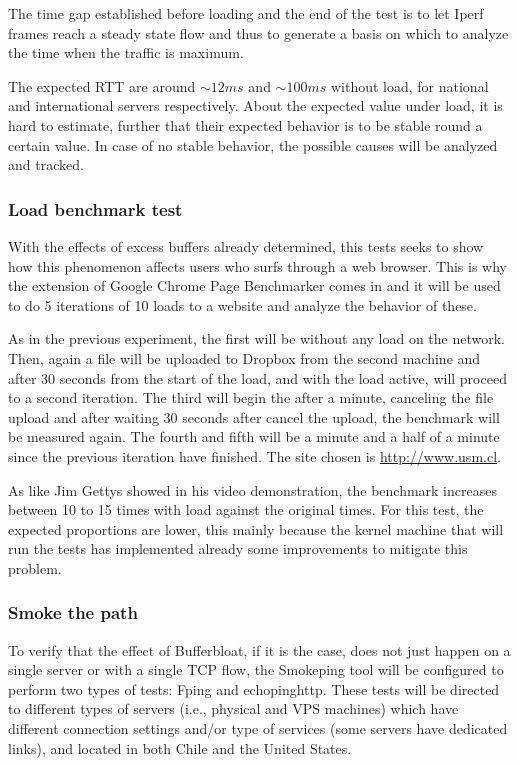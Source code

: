The time gap established before loading and the end of the test is to let
Iperf frames reach a steady state flow and thus to generate a basis on which
to analyze the time when the traffic is maximum.

The expected RTT are around $\sim12ms$ and $\sim100ms$ without load, for
national and international servers respectively. About the expected value under
load, it is hard to estimate, further that their expected behavior is 
to be stable round a certain value. In case of no stable behavior, the possible 
causes will be analyzed and tracked.

\subsubsection{Load benchmark test}
With the effects of excess buffers already determined, this tests seeks to show
how this phenomenon affects users who surfs through a web browser. This is why
the extension of Google Chrome Page Benchmarker comes in and it will be used to
do 5 iterations of 10 loads to a website and analyze the behavior of these. 

As in the previous experiment, the first will be without any load on the
network. Then, again a file will be uploaded to Dropbox from the second machine
and after 30 seconds from the start of the load, and with the load active, will
proceed to a second iteration. The third will begin the after a minute,
canceling the file upload and after waiting 30 seconds after cancel the upload,
the benchmark will be measured again. The fourth and fifth will be a minute and
a half of a minute since the previous iteration have finished. The site chosen is
\url{http://www.usm.cl}.

As like Jim Gettys showed in his video demonstration\cite{gettysex}, the 
benchmark increases between 10 to 15 times with load against the original times. 
For this test, the expected proportions are lower, this mainly because the 
kernel machine that will run the tests has implemented already some improvements 
to mitigate this problem.

\subsubsection{Smoke the path}
To verify that the effect of Bufferbloat, if it is the case, does not just
happen on a single server or with a single TCP flow, the Smokeping tool will be
configured to perform two types of tests: Fping and echopinghttp. These tests
will be directed to different types of servers (i.e., physical and VPS machines)
which have different connection settings and/or type of services (some servers
have dedicated links), and located in both Chile and the United States.

